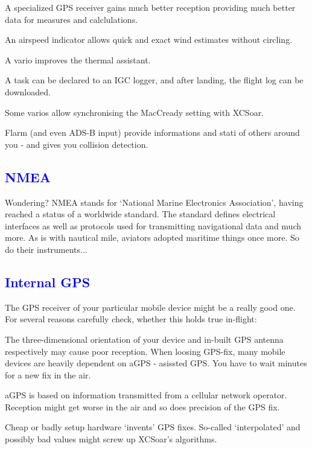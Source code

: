 \begin{compactitem}
\item A specialized GPS receiver gains much better reception providing much 
better data for measures and calclulations.
\item An airspeed indicator allows quick and exact wind estimates without 
circling.
\item A vario improves the thermal assistant.
\item A task can be declared to an IGC logger, and after landing, the 
flight log can be downloaded.
\item Some varios allow synchronising the MacCready setting with XCSoar.
\item Flarm (and even ADS-B input) provide informations and stati of others 
around you - and gives you collision detection.
\end{compactitem}

\subsection*{\textcolor{blue}{NMEA}}
Wondering?  NMEA stands for `National Marine Electronics Association', having 
reached a status of a worldwide standard. The standard defines electrical 
interfaces as well as protocols used for transmitting navigational data and 
much more. As is with nautical mile, aviators adopted maritime things once 
more. So do their instruments...

\subsection*{\textcolor{blue}{Internal GPS}}
The GPS receiver of your particular mobile device might be a really good one. 
For several reasons carefully check, whether this holds true in-flight:

\begin{compactitem}
\item The three-dimensional orientation of your device and in-built GPS 
antenna respectively may cause poor reception.  When loosing GPS-fix, many 
mobile devices are heavily dependent on aGPS - asissted GPS.  You have to wait 
minutes for a new fix in the air.
\item aGPS is based on information transmitted from a cellular network 
operator. Reception might get worse in the air and so does precision of the 
GPS fix.
\item Cheap or badly setup hardware `invents' GPS fixes. So-called 
`interpolated' and possibly bad values might screw up XCSoar's algorithms.
\end{compactitem}

